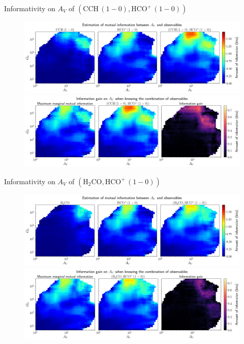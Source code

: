 \documentclass{beamer}
\begin{document}
\begin{frame}{Informativity on $A_V$ of $\left(\mathrm{CCH\,(1-0)},\mathrm{HCO^+\,(1-0)}\right)$}
    \begin{figure}
        \centering
        \includegraphics[width=0.95\linewidth]{../mi/av__cch10_hcop10_mi.png}
        \vfill
        \includegraphics[width=0.95\linewidth]{../mi/av__cch10_hcop10_mi_gain.png}
    \end{figure}
\end{frame}

\begin{frame}{Informativity on $A_V$ of $\left(\mathrm{H_2CO},\mathrm{HCO^+\,(1-0)}\right)$}
    \begin{figure}
        \centering
        \includegraphics[width=0.95\linewidth]{../mi/av__h2co_hcop10_mi.png}
        \vfill
        \includegraphics[width=0.95\linewidth]{../mi/av__h2co_hcop10_mi_gain.png}
    \end{figure}
\end{frame}
\end{document}
